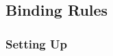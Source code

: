 \subsection*{Binding Rules}
\renewcommand{\arraystretch}{1.1}

\begin{multicols}{2}

\subsubsection*{Setting Up}



\columnbreak



\end{multicols}

\mentalSkillChart

\begin{multicols}{3}



%







\end{multicols}

\physicalSkillChart

